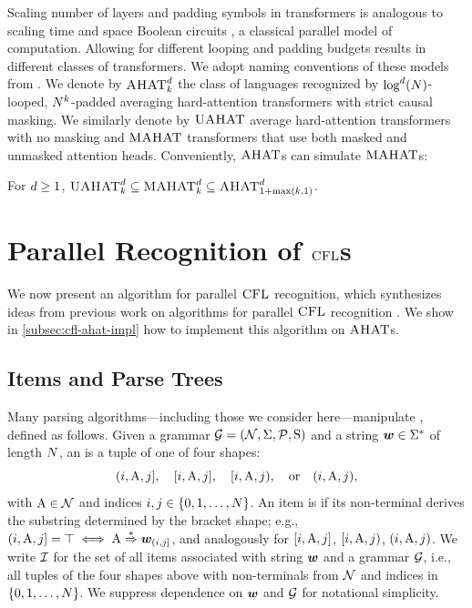 \documentclass{article}
\begin{document}
Scaling number of layers and padding symbols in transformers is analogous to scaling time and space Boolean circuits \citep{merrill2025exactexpressivepowertransformers}, a classical parallel model of computation. 
Allowing for different looping and padding budgets results in different classes of transformers.
We adopt naming conventions of these models from \citet{merrill2025exactexpressivepowertransformers}.
We denote by ${{\textsc{AHAT}}}^d_k$ the class of languages recognized by $\log^d({{ N}})$-looped, ${{ N}}^k$-padded averaging hard-attention transformers with strict causal masking.
We similarly denote by ${{\textsc{UAHAT}}}$ average hard-attention transformers with no masking and ${{\textsc{MAHAT}}}$ transformers that use both masked and unmasked attention heads.
Conveniently, ${{\textsc{AHAT}}}$s can simulate ${{\textsc{MAHAT}}}$s:
\begin{lemma}\label{unmask2mask}
    For ${{ d}} \geq 1$, ${{\textsc{UAHAT}}}^{{ d}}_{{ k}} \subseteq {{\textsc{MAHAT}}}^{{ d}}_{{ k}} \subseteq {{\textsc{AHAT}}}^{{ d}}_{1 + \max({{ k}}, 1)}$.
\end{lemma}


\section{Parallel Recognition of ${\textsc{CFL}}$s}\label{sec:generalcfl}

We now present an algorithm for parallel ${\textsc{CFL}}$ recognition, which synthesizes ideas from previous work on algorithms for parallel ${\textsc{CFL}}$ recognition \citep{ruzzo-treesize, rossmanith-observationsparallelrec, lange-unambiguous}. 
We show in \cref{subsec:cfl-ahat-impl} how to implement this algorithm on ${{\textsc{AHAT}}}$s.

\subsection{Items and Parse Trees}\label{subsec:itemsandtrees}
Many parsing algorithms---including those we consider here---manipulate , defined as follows.
Given a grammar $\grammar = \cfgtuple$ and a string ${{\boldsymbol{w}}} \in {{{{ \Sigma}}^*}}$ of length ${{ N}}$, an  is a tuple of one of four shapes:
\begin{equation*}
    ({{ i}}, {{ \mathrm{A}}}, {{ j}}], \quad [{{ i}}, {{ \mathrm{A}}}, {{ j}}], \quad [{{ i}}, {{ \mathrm{A}}}, {{ j}}), \quad \text{or} \quad ({{ i}}, {{ \mathrm{A}}}, {{ j}}),
\end{equation*}
with ${{ \mathrm{A}}} \in {{ \mathcal{N}}}$ and indices ${{ i}}, {{ j}} \in {{\{ 0, 1, \ldots, {{ N}}\}}}$.
An item is  if its non-terminal derives the substring determined by the bracket shape; e.g., $({{ i}}, {{ \mathrm{A}}}, {{ j}}] = \top \iff {{ \mathrm{A}}} \mathrel{{\overset{*}{\Rightarrow}}} {{\boldsymbol{w}}}_{({{ i}}, {{ j}}]}$, and analogously for $[{{ i}}, {{ \mathrm{A}}}, {{ j}}]$, $[{{ i}}, {{ \mathrm{A}}}, {{ j}})$, $({{ i}}, {{ \mathrm{A}}}, {{ j}})$.
We write ${{\mathcal{I}}}$ for the set of all items associated with string ${{\boldsymbol{w}}}$ and a grammar ${{ \mathcal{G}}}$, i.e., all tuples of the four shapes above with non-terminals from ${{ \mathcal{N}}}$ and indices in ${{\{ 0, 1, \ldots, {{ N}} \}}}$.
We suppress dependence on ${{\boldsymbol{w}}}$ and ${{ \mathcal{G}}}$ for notational simplicity.
\end{document}
